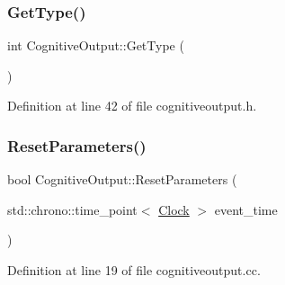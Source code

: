 \mbox{\label{class_cognitive_output_ac5ead5e6a98556d6779eda5679b69594}} 
\subsubsection{\texorpdfstring{Get\+Type()}{GetType()}}
{\footnotesize\ttfamily int Cognitive\+Output\+::\+Get\+Type (\begin{DoxyParamCaption}{ }\end{DoxyParamCaption})\hspace{0.3cm}{\ttfamily [inline]}}



Definition at line 42 of file cognitiveoutput.\+h.

\mbox{\label{class_cognitive_output_ab43b79aaadf75d18512c4379a77542cd}} 
\subsubsection{\texorpdfstring{Reset\+Parameters()}{ResetParameters()}}
{\footnotesize\ttfamily bool Cognitive\+Output\+::\+Reset\+Parameters (\begin{DoxyParamCaption}\item[{std\+::chrono\+::time\+\_\+point$<$ \hyperlink{universe_8h_a0ef8d951d1ca5ab3cfaf7ab4c7a6fd80}{Clock} $>$}]{event\+\_\+time }\end{DoxyParamCaption})}



Definition at line 19 of file cognitiveoutput.\+cc.

